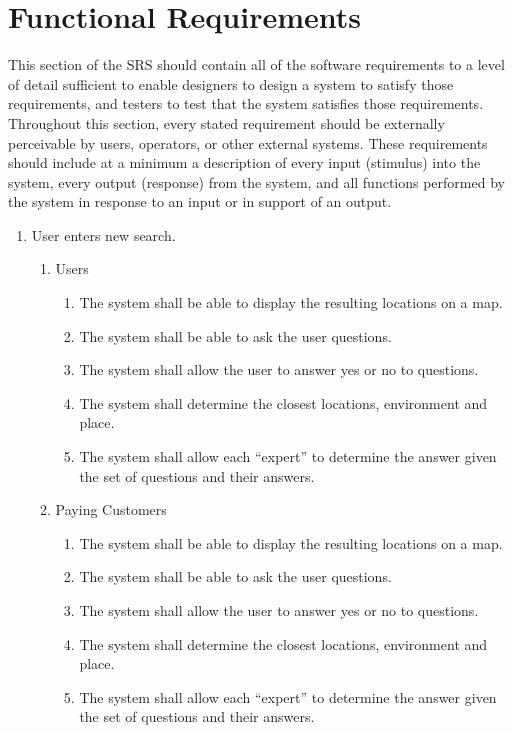 \documentclass[titlepage]{article}
\begin{document}
\section{Functional Requirements}
\label{sec:functional_requirements}
This section of the SRS should contain all of the software requirements to a level of detail sufficient to enable designers to design a system to satisfy those requirements, and testers to test that the system satisfies those requirements. Throughout this section, every stated requirement should be externally perceivable by users, operators, or other external systems. These requirements should include at a minimum a description of every input (stimulus) into the system, every output (response) from the system, and all functions performed by the system in response to an input or in support of an output.
\begin{enumerate}[\textbf{{BE}1.}]
	\item User enters new search.
	\begin{enumerate}[\textbf{{VP1}.1}]
		
		\item Users
			\begin{enumerate}
				\item The system shall be able to display the resulting locations on a map.
				\item The system shall be able to ask the user questions.
				\item The system shall allow the user to answer yes or no to questions.
				\item The system shall determine the closest locations, environment and place.
				\item The system shall allow each “expert” to determine the answer given the set of questions and their answers.
			\end{enumerate}
		
		\item Paying Customers
			\begin{enumerate}
				\item The system shall be able to display the resulting locations on a map.
				\item The system shall be able to ask the user questions.
				\item The system shall allow the user to answer yes or no to questions.
				\item The system shall determine the closest locations, environment and place.
				\item The system shall allow each “expert” to determine the answer given the set of questions and their answers.
			\end{enumerate}
		

\end{enumerate}
\end{enumerate}
\end{document}
